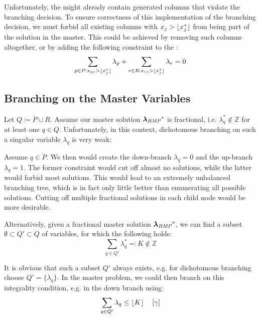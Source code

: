 Unfortunately, the \RMP{} might already contain generated columns that violate the branching decision. To ensure correctness of this implementation of the branching decision, we must forbid all existing columns with $x_j > \lfloor x_j^*\rfloor$ from being part of the solution in the master. This could be achieved by removing such columns altogether, or by adding the following constraint to the \MP{}:
\begin{equation}
\sum_{p \in P: x_{pj} > \lfloor x_j^*\rfloor} \lambda_p + \sum_{r \in R: x_{rj} > \lfloor x_j^*\rfloor} \lambda_r = 0
\end{equation}

\subsection{Branching on the Master Variables}\label{sec:cg_bp_bp_branching_master}
Let $Q \coloneqq \ddot{P} \cup R$. Assume our master solution ${\bm{\lambda}}_{\textit{RMP}}{}^*$ is fractional, i.e. $\lambda_q^* \not\in \mathbb{Z}$ for at least one $q \in Q$. Unfortunately, in this context, dichotomous branching on such a singular variable $\lambda_q$ is very weak:

Assume $q \in \ddot{P}$. We then would create the down-branch $\lambda_q = 0$ and the up-branch $\lambda_q = 1$. The former constraint would cut off almost no solutions, while the latter would forbid most solutions. This would lead to an extremely unbalanced branching tree, which is in fact only little better than enumerating all possible solutions. Cutting off multiple fractional solutions in each child node would be more desirable.

Alternatively, given a fractional master solution ${\bm{\lambda}}_{\textit{RMP}}{}^*$, we can find a subset $\emptyset \subset Q' \subset Q$ of variables, for which the following holds:
\begin{equation}
\sum_{q \in Q'} \lambda_q^* \eqqcolon K \not\in \mathbb{Z}
\end{equation}

It is obvious that such a subset $Q'$ always exists, e.g. for dichotomous branching choose $Q' = \{\lambda_q\}$. In the master problem, we could then branch on this integrality condition, e.g. in the down branch using:
\begin{equation}
\sum_{q \in Q'} \lambda_q \leq \lfloor K\rfloor \quad \left[\gamma\right]
\end{equation}


